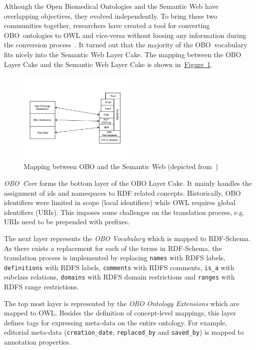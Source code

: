 \documentclass[draft,final]{vutinfth} %
\begin{document}
Although the Open Biomedical Ontologies and the Semantic Web have overlapping objectives, they evolved independently. To bring these two communities together, researchers have created a tool for converting OBO~ontologies to OWL and vice-versa without loosing any information during the conversion process~\cite{tirmizi2011}. It turned out that the majority of the OBO~vocabulary fits nicely into the Semantic Web Layer Cake. The mapping between the OBO Layer Cake and the Semantic Web Layer Cake is shown in~\hyperref[fig:semantic_obo_cake]{Figure~\ref*{fig:semantic_obo_cake}}. 

\begin{figure}
	 \centering
	 \includegraphics[width=0.5\textwidth]{drawio/Obo2Owl}
	 \caption{Mapping between OBO and the Semantic Web (depicted from~\cite{tirmizi2011})}\label{fig:semantic_obo_cake}
\end{figure}

\emph{OBO~Core} forms the bottom layer of the OBO Layer Cake. It mainly handles the assignment of ids and namespaces to RDF related concepts. Historically, OBO identifiers were limited in scope (local identifiers) while OWL requires global identifiers (URIs). This imposes some challenges on the translation process, e.g. URIs need to be prepended with prefixes. 

The next layer represents the \emph{OBO Vocabulary} which is mapped to RDF-Schema. As there exists a replacement for each of the terms in RDF-Schema, the translation process is implemented by replacing \texttt{names} with RDFS labels, \texttt{definitions} with RDFS labels, \texttt{comments} with RDFS comments, \texttt{is\_a} with subclass relations, \texttt{domains} with RDFS domain restrictions and \texttt{ranges} with RDFS range restrictions. 

The top most layer is represented by the \emph{OBO Ontology Extensions} which are mapped to OWL. Besides the definition of concept-level mappings, this layer defines tags for expressing meta-data on the entire ontology. For example, editorial meta-data (\texttt{creation\_date}, \texttt{replaced\_by} and \texttt{saved\_by}) is mapped to annotation properties. 
\end{document}
